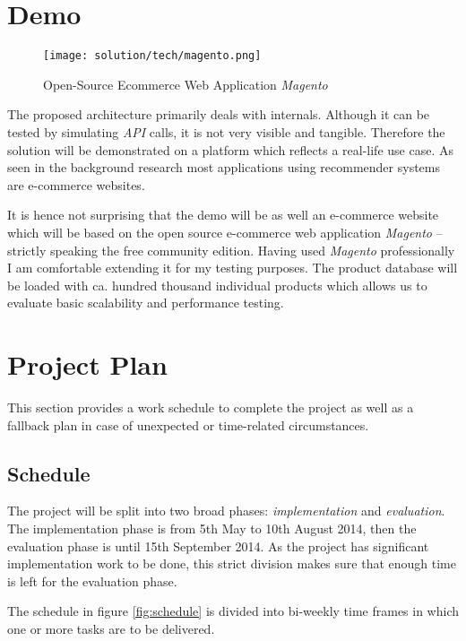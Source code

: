 \section{Demo}

\begin{figure}[!ht]
    \texttt{[image: solution/tech/magento.png]}
    \caption{Open-Source Ecommerce Web Application \emph{Magento}}
    \label{fig:magento}
\end{figure}

The proposed architecture primarily deals with internals. Although it can be tested by simulating \emph{API} calls, it is not very visible and tangible. Therefore the solution will be demonstrated on a platform which reflects a real-life use case. As seen in the background research most applications using recommender systems are e-commerce websites. 

It is hence not surprising that the demo will be as well an e-commerce website which will be based on the open source e-commerce web application \emph{Magento} -- strictly speaking the free community edition. Having used \emph{Magento} professionally I am comfortable extending it for my testing purposes. The product database will be loaded with ca. hundred thousand individual products which allows us to evaluate basic scalability and performance testing.



\section{Project Plan}

This section provides a work schedule to complete the project as well as a fallback plan in case of unexpected or time-related circumstances.

\subsection{Schedule}

The project will be split into two broad phases: \emph{implementation} and \emph{evaluation}. The implementation phase is from 5th May to 10th August 2014, then the evaluation phase is until 15th September 2014. As the project has significant implementation work to be done, this strict division makes sure that enough time is left for the evaluation phase.

The schedule in figure \ref{fig:schedule} is divided into bi-weekly time frames in which one or more tasks are to be delivered. 

